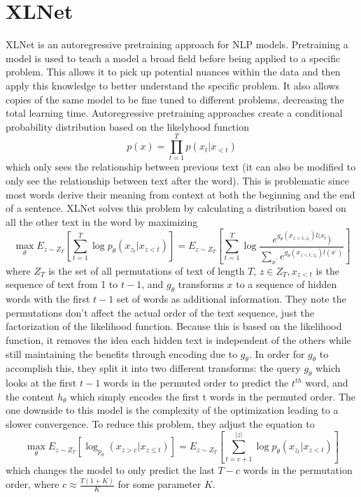 \documentclass{article}
\begin{document}
\section{XLNet}
XLNet is an autoregressive pretraining approach for NLP models. Pretraining a model is used to teach a model a broad field before being applied to a specific problem. This allows it to pick up potential nuances within the data and then apply this knowledge to better understand the specific problem. It also allows copies of the same model to be fine tuned to different problems, decreasing the total learning time. Autoregressive pretraining approaches create a conditional probability distribution based on the likelyhood function \begin{equation*}
    p(x)=\prod_{t=1}^{T}p(x_{t}|x_{<t})
\end{equation*} which only sees the relationship between previous text (it can also be modified to only see the relationship between text after the word). This is problematic since most words derive their meaning from context at both the beginning and the end of a sentence. XLNet solves this problem by calculating a distribution based on all the other text in the word by maximizing \begin{equation*}
    \max_{\theta}E_{z\sim Z_{T}}\left[\sum_{t=1}^{T}\log p_{\theta}(x_{z_{t}}|x_{z<t})\right]=E_{z\sim Z_{T}}\left[\sum_{t=1}^{T}\log\frac{e^{g_{\theta}(x_{z<t,z_{t}})l(x_{t}})}{\sum_{x^{'}}e^{g_{\theta}(x_{z<t,z_{t}})l(x^{'})}}\right]
\end{equation*} where $Z_{T}$ is the set of all permutations of text of length $T$, $z \in Z_{T}, x_{z<t}$ is the sequence of text from 1 to $t−1$, and $g_{\theta}$ transforms $x$ to a sequence of hidden words with the first $t-1$ set of words as additional information. They note the permutations don’t affect the actual order of the text sequence, just the factorization of the likelihood function. Because this is based on the likelihood function, it removes the idea each hidden text is independent of the others while still maintaining the benefits through encoding due to  $g_{\theta}$. In order for  $g_{\theta}$ to accomplish this, they split it into two different transforms: the query $g_{\theta}$ which looks at the first $t-1$ words in the permuted order to predict the  $t^{th}$ word, and the content  $h_{\theta}$ which simply encodes the first t words in the permuted order. The one downside to this model is the complexity of the optimization leading to a slower convergence. To reduce this problem, they adjust the equation to \begin{equation*}
    \max_{\theta}E_{z \sim Z_{T}}\left[\log_{p_{\theta}}(x_{z>c}|x_{z\leq t})\right]=E_{z\sim Z_{T}}\left[\sum_{t=c+1}^{|z|}\log p_{\theta}(x_{z_{t}}|x_{z<t})\right]
\end{equation*}
which changes the model to only predict the last $T - c$ words in the permutation order, where $c \approx \frac{T(1+K)}{K}$
for some parameter $K$.
\end{document}

